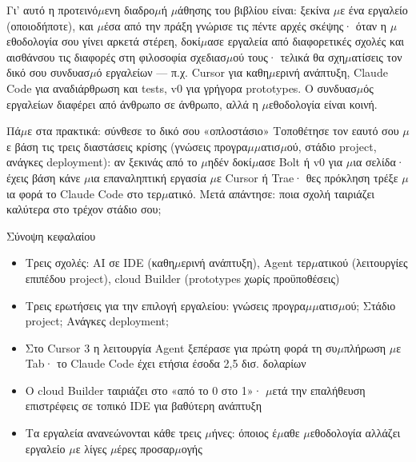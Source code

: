 Γι' αυτό η προτεινό$\mu$ενη διαδρο$\mu$ή $\mu$άθησης του βιβλίου είναι: ξεκίνα $\mu$ε ένα εργαλείο (οποιοδήποτε), και $\mu$έσα από την πράξη γνώρισε τις πέντε αρχές σκέψης· όταν η $\mu$εθοδολογία σου γίνει αρκετά στέρεη, δοκί$\mu$ασε εργαλεία από διαφορετικές σχολές και αισθάνσου τις διαφορές στη φιλοσοφία σχεδιασ$\mu$ού τους· τελικά θα σχη$\mu$ατίσεις τον δικό σου συνδυασ$\mu$ό εργαλείων — π.χ. Cursor για καθη$\mu$ερινή ανάπτυξη, Claude Code για αναδιάρθρωση και tests, v0 για γρήγορα prototypes. Ο συνδυασ$\mu$ός εργαλείων διαφέρει από άνθρωπο σε άνθρωπο, αλλά η $\mu$εθοδολογία είναι κοινή.

\begin{tcbpractice}{Πά$\mu$ε στα πρακτικά: σύνθεσε το δικό σου «οπλοστάσιο»}
Τοποθέτησε τον εαυτό σου $\mu$ε βάση τις τρεις διαστάσεις κρίσης (γνώσεις προγρα$\mu$$\mu$ατισ$\mu$ού, στάδιο project, ανάγκες deployment): αν ξεκινάς από το $\mu$ηδέν δοκί$\mu$ασε Bolt ή v0 για $\mu$ια σελίδα· έχεις βάση κάνε $\mu$ια επαναληπτική εργασία $\mu$ε Cursor ή Trae· θες πρόκληση τρέξε $\mu$ια φορά το Claude Code στο τερ$\mu$ατικό. Μετά απάντησε: ποια σχολή ταιριάζει καλύτερα στο τρέχον στάδιο σου;

\end{tcbpractice}

\begin{tcbsummary}{Σύνοψη κεφαλαίου}
\begin{itemize}
  \item Τρεις σχολές: AI σε IDE (καθη$\mu$ερινή ανάπτυξη), Agent τερ$\mu$ατικού (λειτουργίες επιπέδου project), cloud Builder (prototypes χωρίς προϋποθέσεις)
  \item Τρεις ερωτήσεις για την επιλογή εργαλείου: γνώσεις προγρα$\mu$$\mu$ατισ$\mu$ού; Στάδιο project; Ανάγκες deployment;
  \item Στο Cursor 3 η λειτουργία Agent ξεπέρασε για πρώτη φορά τη συ$\mu$πλήρωση $\mu$ε Tab· το Claude Code έχει ετήσια έσοδα 2,5 δισ. δολαρίων
  \item Ο cloud Builder ταιριάζει στο «από το 0 στο 1»· $\mu$ετά την επαλήθευση επιστρέφεις σε τοπικό IDE για βαθύτερη ανάπτυξη
  \item Τα εργαλεία ανανεώνονται κάθε τρεις $\mu$ήνες: όποιος έ$\mu$αθε $\mu$εθοδολογία αλλάζει εργαλείο $\mu$ε λίγες $\mu$έρες προσαρ$\mu$ογής
\end{itemize}

\end{tcbsummary}
